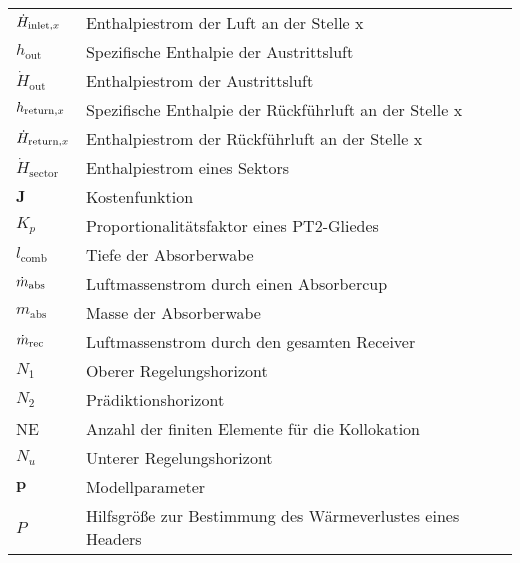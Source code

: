 \begin{longtable}{p{}p{}}
    $\dot{H}_{\mathrm{inlet,}x}$         & Enthalpiestrom der Luft an der Stelle x                          \\
    $h_{\mathrm{out}}$               & Spezifische Enthalpie der Austrittsluft                          \\
    $\dot{H}_{\mathrm{out}}$         & Enthalpiestrom der Austrittsluft                                 \\
    $h_{\mathrm{return,}x}$    & Spezifische Enthalpie der Rückführluft an der Stelle x           \\
    $\dot{H}_{\mathrm{return,}x}$        & Enthalpiestrom der Rückführluft an der Stelle x                  \\
    $\dot{H}_{\mathrm{sector}}$      & Enthalpiestrom eines Sektors                                     \\
    $\boldsymbol{J}$                 & Kostenfunktion                                                   \\
    $K_p$                            & Proportionalitätsfaktor eines PT2-Gliedes                        \\
    $l_{\mathrm{comb}}$              & Tiefe der Absorberwabe                                           \\
    $\dot{m}_{\mathrm{abs}}$               & Luftmassenstrom durch einen Absorbercup                          \\
    $m_{\mathrm{abs}}$               & Masse der Absorberwabe                                           \\
    $\dot{m}_{\mathrm{rec}}$                  & Luftmassenstrom durch den gesamten Receiver                      \\
    $N_1$                            & Oberer Regelungshorizont                                         \\
    $N_2$                            & Prädiktionshorizont                                              \\
    NE                               & Anzahl der finiten Elemente für die Kollokation                  \\
    $N_u$                            & Unterer Regelungshorizont                                        \\
    $\boldsymbol{p}$                 & Modellparameter                                                  \\
    $P$                              & Hilfsgröße zur Bestimmung des Wärmeverlustes eines Headers       \\

\end{longtable}
